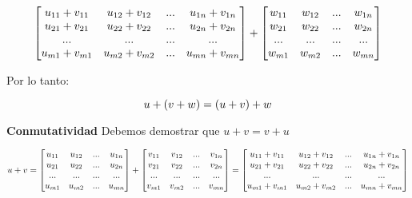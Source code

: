 \documentclass[12pt]{article}
\begin{document}
\begin{equation}\notag
      \begin{bmatrix}
        u_{11} + v_{11}  & u_{12}+v_{12} & ... & u_{1n}+v_{1n} \\
        u_{21} + v_{21}  & u_{22}+v_{22} & ... & u_{2n}+v_{2n} \\
        ... & ... & ... &... \\       
        u_{m1} + v_{m1}  & u_{m2}+v_{m2} & ... & u_{mn}+v_{mn} 
      \end{bmatrix}
      +
      \begin{bmatrix}
        w_{11}  & w_{12} & ... & w_{1n} \\
        w_{21}  & w_{22} & ... & w_{2n} \\
        ...  & ... & ... & ... \\
        w_{m1}  & w_{m2} & ... & w_{mn} 
      \end{bmatrix}
\end{equation}

Por lo tanto:

\begin{equation}\notag
    u+(v+w)=(u+v)+w
\end{equation}

\textbf{Conmutatividad}
Debemos demostrar que $u+v = v+u$

\begin{equation}\notag
    u+v = 
    \begin{bmatrix}
      u_{11}  & u_{12} & ... & u_{1n} \\
      u_{21}  & u_{22} & ... & u_{2n} \\
      ...  & ... & ... & ... \\
      u_{m1}  & u_{m2} & ... & u_{mn} 
    \end{bmatrix} 
    +
    \begin{bmatrix}
        v_{11}  & v_{12} & ... & v_{1n} \\
        v_{21}  & v_{22} & ... & v_{2n} \\
        ...  & ... & ... & ... \\
        v_{m1}  & v_{m2} & ... & v_{mn} 
      \end{bmatrix}
      =
      \begin{bmatrix}
        u_{11} + v_{11}  & u_{12}+v_{12} & ... & u_{1n}+v_{1n} \\
        u_{21} + v_{21}  & u_{22}+v_{22} & ... & u_{2n}+v_{2n} \\
        ...  & ... & ... & ... \\
        u_{m1}+v_{m1}  & u_{m2}+v_{m2} & ... & u_{mn}+v_{mn} 
      \end{bmatrix}
\end{equation}
\end{document}
